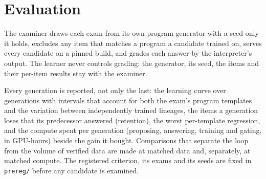\section{Evaluation}\label{sec:evaluation}

The examiner draws each exam from its own program generator with a seed only it holds, excludes any item that matches a
program a candidate trained on, serves every candidate on a pinned build, and grades each answer by the interpreter's output.
The learner never controls grading: the generator, its seed, the items and their per-item results stay with the examiner.

Every generation is reported, not only the last: the learning curve over generations with intervals that account for both the
exam's program templates and the variation between independently trained lineages, the items a generation loses that its
predecessor answered (retention), the worst per-template regression, and the compute spent per generation (proposing,
answering, training and gating, in GPU-hours) beside the gain it bought. Comparisons that separate the loop from the volume of
verified data are made at matched data and, separately, at matched compute. The registered criterion, its exams and its seeds
are fixed in \texttt{prereg/} before any candidate is examined.
